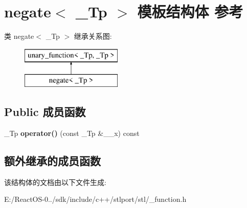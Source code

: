 \hypertarget{structnegate}{}\section{negate$<$ \+\_\+\+Tp $>$ 模板结构体 参考}
\label{structnegate}
类 negate$<$ \+\_\+\+Tp $>$ 继承关系图\+:\begin{figure}[H]
\begin{center}
\leavevmode
\includegraphics[height=2.000000cm]{structnegate}
\end{center}
\end{figure}
\subsection*{Public 成员函数}
\begin{DoxyCompactItemize}
\item 
\mbox{\label{structnegate_a49010b87ab9079a040838c64c474e362}} 
\+\_\+\+Tp {\bfseries operator()} (const \+\_\+\+Tp \&\+\_\+\+\_\+x) const
\end{DoxyCompactItemize}
\subsection*{额外继承的成员函数}


该结构体的文档由以下文件生成\+:\begin{DoxyCompactItemize}
\item 
E\+:/\+React\+O\+S-\/0../sdk/include/c++/stlport/stl/\+\_\+function.\+h\end{DoxyCompactItemize}
